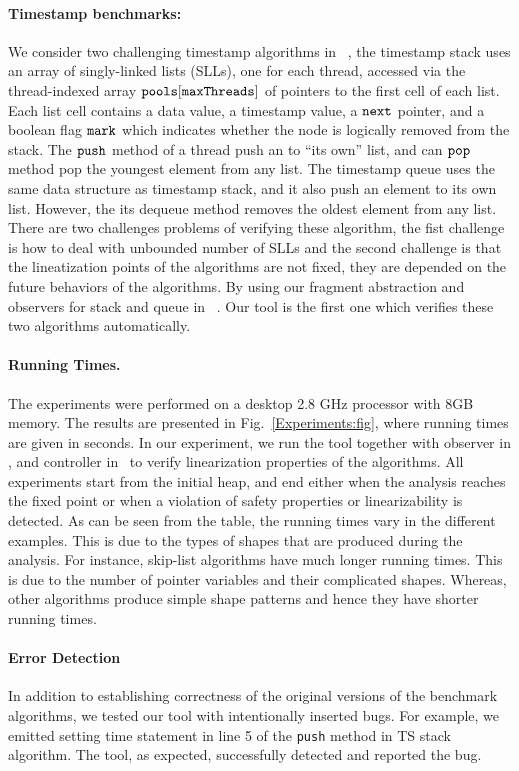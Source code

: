 \paragraph{Timestamp benchmarks:} We consider two challenging timestamp algorithms in ~\cite{ts-stack}, the timestamp stack uses an array of singly-linked lists (SLLs), one for each thread, accessed via the thread-indexed array ${\tt pools[maxThreads]}$ of pointers to the first cell of each list. Each list cell contains a data value, a timestamp value, a ${\tt next}$ pointer, and a boolean flag ${\tt mark}$ which indicates whether the node is logically removed from the stack. The $\tt push$ method of a thread push an to ``its own'' list, and can $\tt pop$ method pop the youngest element from any list. The timestamp queue uses the same data structure as timestamp stack, and it also push an element to its own list. However, the its dequeue method removes the oldest element from any list. There are two challenges problems of verifying these algorithm, the fist challenge is how to deal with unbounded number of SLLs and the second challenge is that the lineatization points of the algorithms are not fixed, they are depended on the future behaviors of the algorithms. By using our fragment abstraction and observers for stack and queue in ~\cite{BEEH:icalp15}. Our tool is the first one which verifies these two algorithms automatically.

\paragraph{Running Times.}The experiments were performed on a desktop 2.8 GHz processor with 8GB memory. The results are presented in Fig.~\ref{Experiments:fig}, where running times are given in seconds. In our experiment, we run the tool together with observer in \cite{AHHR:integrated:rep}, \cite{BEEH:icalp15} and controller in~\cite{Quy:sas16} to verify linearization properties of the algorithms. All experiments start from the initial heap,  
and end either when the analysis reaches the fixed point or when a violation of safety properties or linearizability is detected. As can be seen from the table, the running times vary in the different examples. This is due to the types of shapes that are produced during the analysis. For instance, skip-list algorithms have much longer running times. This is due to the number of pointer variables and their complicated shapes. Whereas, other algorithms 
produce simple shape patterns and hence they have shorter running times.
\paragraph{Error Detection}
 In addition to establishing correctness of the original versions of the
benchmark algorithms, we tested our tool with intentionally inserted bugs. For example, we emitted setting time statement in line 5 of the {\tt push} method in TS stack algorithm. The tool, as expected, successfully detected and reported the bug.
 

